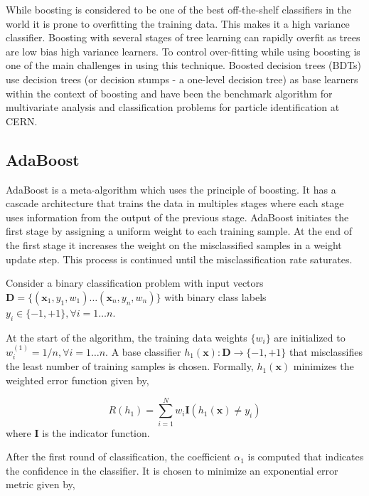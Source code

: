 While boosting is considered to be one of the best off-the-shelf classifiers in the world it is prone to overfitting the training data. This makes it a high variance classifier. Boosting with several stages of tree learning can rapidly overfit as trees are low bias high variance learners. To control over-fitting while using boosting is one of the main challenges in using this technique. Boosted decision trees (BDTs) use decision trees (or decision stumps - a one-level decision tree) as base learners within the context of boosting and have been the benchmark algorithm for multivariate analysis and classification problems for particle identification at CERN. 

\subsection{AdaBoost}

AdaBoost is a meta-algorithm which uses the principle of boosting. It has a cascade architecture that trains the data in multiples stages where each stage uses information from the output of the previous stage. AdaBoost initiates the first stage by assigning a uniform weight to each training sample. At the end of the first stage it increases the weight on the misclassified samples in a weight update step. This process is continued until the misclassification rate saturates. 

Consider a binary classification problem with input vectors $\mathbf{D} = \{(\mathbf{x}_{1},y_{1},w_{1}) \ldots (\mathbf{x}_{n},y_{n},w_{n})\}$ with binary class labels $y_{i} \in \{-1,+1\}, \forall i=1 \ldots n$. 

At the start of the algorithm, the training data weights $\{w_{i}\}$ are initialized to $w_{i}^{(1)} = 1/n, \forall i=1 \ldots n$. A base classifier $h_{1}(\mathbf{x}): \mathbf{D} \rightarrow \{-1,+1\} $ that misclassifies the least number of training samples is chosen. Formally, $h_{1}(\mathbf{x})$ minimizes the weighted error function given by, 

\begin{equation}
R(h_{1}) = \sum_{i=1}^{N}w_{i}\mathbf{I}(h_{1}(\mathbf{x}) \neq y_{i})
\end{equation}
where $\mathbf{I}$ is the indicator function.  
 
After the first round of classification,  the coefficient $\alpha_{1}$ is computed that indicates the confidence in the classifier. It is chosen to minimize an exponential error metric given by,

